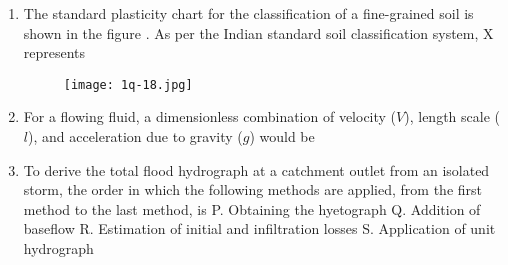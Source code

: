 \documentclass[journal,12pt,onecolumn]{article}
\theoremstyle{remark}
\begin{document}
\begin{enumerate}
\item The standard plasticity chart for the classification of a fine-grained soil is shown in the figure . As per the Indian standard soil classification system, X represents
\begin{figure}[H]
    \centering
    \texttt{[image: 1q-18.jpg]}
    \caption{}
    \label{fig:q18}
\end{figure}

\hfill{}
\begin{enumerate}
\end{enumerate}

\item For a flowing fluid, a dimensionless combination of velocity ($V$), length scale ($l$), and acceleration due to gravity ($g$) would be

\hfill{}
\begin{enumerate}
\end{enumerate}

\item To derive the total flood hydrograph at a catchment outlet from an isolated storm, the order in which the following methods are applied, from the first method to the last method, is
P. Obtaining the hyetograph
Q. Addition of baseflow
R. Estimation of initial and infiltration losses
S. Application of unit hydrograph

\hfill{}
\begin{enumerate}
\end{enumerate}


\end{enumerate}
\end{document}
